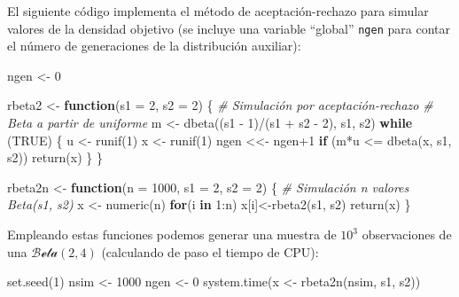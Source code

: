 \documentclass[
]{book}
\newenvironment{Shaded}{\begin{snugshade}}{\end{snugshade}}
\newcommand{\AttributeTok}[1]{\textcolor[rgb]{0.77,0.63,0.00}{#1}}
\newcommand{\CommentTok}[1]{\textcolor[rgb]{0.56,0.35,0.01}{\textit{#1}}}
\newcommand{\ConstantTok}[1]{\textcolor[rgb]{0.00,0.00,0.00}{#1}}
\newcommand{\ControlFlowTok}[1]{\textcolor[rgb]{0.13,0.29,0.53}{\textbf{#1}}}
\newcommand{\DecValTok}[1]{\textcolor[rgb]{0.00,0.00,0.81}{#1}}
\newcommand{\FunctionTok}[1]{\textcolor[rgb]{0.00,0.00,0.00}{#1}}
\newcommand{\NormalTok}[1]{#1}
\newcommand{\OtherTok}[1]{\textcolor[rgb]{0.56,0.35,0.01}{#1}}
\newcommand{\SpecialCharTok}[1]{\textcolor[rgb]{0.00,0.00,0.00}{#1}}
\theoremstyle{break}
\theoremstyle{nonumberplain}
\begin{document}
El siguiente código implementa el método de aceptación-rechazo para simular valores de la densidad objetivo (se incluye una variable ``global'' \texttt{ngen} para contar el número de generaciones de la distribución auxiliar):

\begin{Shaded}
\begin{Highlighting}[]
\NormalTok{ngen }\OtherTok{\textless{}{-}} \DecValTok{0} 

\NormalTok{rbeta2 }\OtherTok{\textless{}{-}} \ControlFlowTok{function}\NormalTok{(}\AttributeTok{s1 =} \DecValTok{2}\NormalTok{, }\AttributeTok{s2 =} \DecValTok{2}\NormalTok{) \{}
  \CommentTok{\# Simulación por aceptación{-}rechazo}
  \CommentTok{\# Beta a partir de uniforme}
\NormalTok{  m }\OtherTok{\textless{}{-}} \FunctionTok{dbeta}\NormalTok{((s1 }\SpecialCharTok{{-}} \DecValTok{1}\NormalTok{)}\SpecialCharTok{/}\NormalTok{(s1 }\SpecialCharTok{+}\NormalTok{ s2 }\SpecialCharTok{{-}} \DecValTok{2}\NormalTok{), s1, s2)}
  \ControlFlowTok{while}\NormalTok{ (}\ConstantTok{TRUE}\NormalTok{) \{}
\NormalTok{    u }\OtherTok{\textless{}{-}} \FunctionTok{runif}\NormalTok{(}\DecValTok{1}\NormalTok{)}
\NormalTok{    x }\OtherTok{\textless{}{-}} \FunctionTok{runif}\NormalTok{(}\DecValTok{1}\NormalTok{)}
\NormalTok{    ngen }\OtherTok{\textless{}\textless{}{-}}\NormalTok{ ngen}\SpecialCharTok{+}\DecValTok{1}
    \ControlFlowTok{if}\NormalTok{ (m}\SpecialCharTok{*}\NormalTok{u }\SpecialCharTok{\textless{}=} \FunctionTok{dbeta}\NormalTok{(x, s1, s2)) }\FunctionTok{return}\NormalTok{(x)}
\NormalTok{  \}}
\NormalTok{\}}

\NormalTok{rbeta2n }\OtherTok{\textless{}{-}} \ControlFlowTok{function}\NormalTok{(}\AttributeTok{n =} \DecValTok{1000}\NormalTok{, }\AttributeTok{s1 =} \DecValTok{2}\NormalTok{, }\AttributeTok{s2 =} \DecValTok{2}\NormalTok{) \{}
  \CommentTok{\# Simulación n valores Beta(s1, s2)}
\NormalTok{  x }\OtherTok{\textless{}{-}} \FunctionTok{numeric}\NormalTok{(n)}
  \ControlFlowTok{for}\NormalTok{(i }\ControlFlowTok{in} \DecValTok{1}\SpecialCharTok{:}\NormalTok{n) x[i]}\OtherTok{\textless{}{-}}\FunctionTok{rbeta2}\NormalTok{(s1, s2)}
  \FunctionTok{return}\NormalTok{(x)}
\NormalTok{\}}
\end{Highlighting}
\end{Shaded}

Empleando estas funciones podemos generar una muestra de \(10^3\) observaciones de una \(\mathcal{Beta}(2, 4)\) (calculando de paso el tiempo de CPU):

\begin{Shaded}
\begin{Highlighting}[]
\FunctionTok{set.seed}\NormalTok{(}\DecValTok{1}\NormalTok{)}
\NormalTok{nsim }\OtherTok{\textless{}{-}} \DecValTok{1000}
\NormalTok{ngen }\OtherTok{\textless{}{-}} \DecValTok{0}
\FunctionTok{system.time}\NormalTok{(x }\OtherTok{\textless{}{-}} \FunctionTok{rbeta2n}\NormalTok{(nsim, s1, s2))}
\end{Highlighting}
\end{Shaded}
\end{document}
